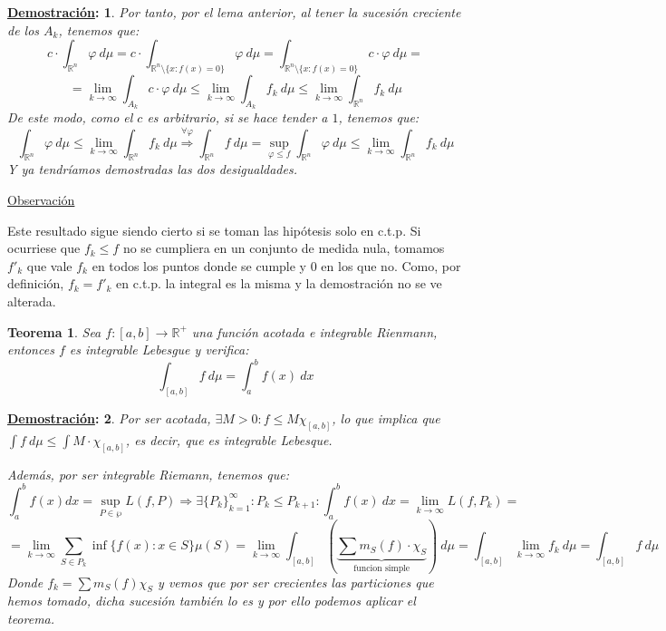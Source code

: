 \documentclass[10pt,a4paper,openright]{book}
\theoremstyle{break}
\newtheorem*{theo}{Teorema}
\newtheorem*{demo}{\underline{Demostración}:}
\begin{document}
\begin{demo}
Por tanto, por el lema anterior, al tener la sucesión creciente de los $A_k$, tenemos que:
$$c \cdot \int_{\mathbb{R}^n}\varphi \ d \mu = c\cdot \int_{\mathbb{R}^n \setminus \{x : f\left(x\right) = 0\}}\varphi \ d \mu = \int_{\mathbb{R}^n \setminus \{x : f\left(x\right) = 0\}} c  \cdot \varphi \ d \mu = $$
$$=\lim_{k\rightarrow\infty} \int_{A_k} c \cdot \varphi \ d \mu \le \lim_{k\rightarrow\infty} \int_{A_k} f_k \ d \mu \le \lim_{k\rightarrow\infty} \int_{\mathbb{R}^n} f_k \ d \mu$$
De este modo, como el $c$ es arbitrario, si se hace tender a $1$, tenemos que:
$$\int_{\mathbb{R}^n} \varphi \ d \mu \le \lim_{k\rightarrow\infty} \int_{\mathbb{R}^n} f_k \ d \mu \stackrel{\forall \varphi}{\Rightarrow} \int_{\mathbb{R}^n}f \ d \mu = \sup_{\varphi \le f} \int_{\mathbb{R}^n}\varphi \ d \mu \le \lim_{k\rightarrow\infty} \int_{\mathbb{R}^n}f_k \ d \mu$$
Y ya tendríamos demostradas las dos desigualdades.
\end{demo}

\underline{Observación}

Este resultado sigue siendo cierto si se toman las hipótesis solo en c.t.p. Si ocurriese que $f_k \leq f$ no se cumpliera en un conjunto de medida nula, tomamos $f'_k$ que vale $f_k$ en todos los puntos donde se cumple y 0 en los que no. Como, por definición, $f_k = f'_k$ en c.t.p. la integral es la misma y la demostración no se ve alterada.


\begin{theo}
Sea $f: \left[a, b\right] \rightarrow \mathbb{R}^+$ una función acotada e integrable Rienmann, entonces $f$ es integrable Lebesgue y verifica:
$$\int_{\left[a, b\right]}f \ d \mu = \int_a^b f\left(x\right)\ dx$$
\end{theo}
\begin{demo}
Por ser acotada, $\exists M > 0: f \le M\chi_{\left[a, b\right]}$, lo que implica que $\int f \ d \mu \leq \int M \cdot \chi_{[a,b]}$, es decir, que es integrable Lebesque.

Además, por ser integrable Riemann, tenemos que:
$$\int_a^b f\left(x\right)dx = \sup_{P \in \wp} L\left(f, P\right) \Rightarrow \exists \{P_k\}_{k=1}^{\infty} : P_k \leq P_{k+1} : \int_a^b f\left(x\right) \ dx = \lim_{k\rightarrow \infty} L\left(f, P_k\right) = $$
$$= \lim_{k\rightarrow\infty} \sum_{S \in P_k} \inf \{f\left(x\right) : x \in S\}\mu\left(S\right) = \lim_{k\rightarrow\infty} \int_{\left[a, b\right]}\left(\underbrace{\sum m_S \left(f\right) \cdot \chi_S}_{\text{funcion simple}}\right) \ d \mu = \int_{\left[a, b\right]}\lim_{k\rightarrow\infty} f_k \ d \mu = \int_{\left[a, b\right]}f \ d \mu$$
Donde $f_k = \sum m_S\left(f\right) \chi_S$ y vemos que por ser crecientes las particiones que hemos tomado, dicha sucesión también lo es y por ello podemos aplicar el teorema.
\end{demo}
\end{document}
